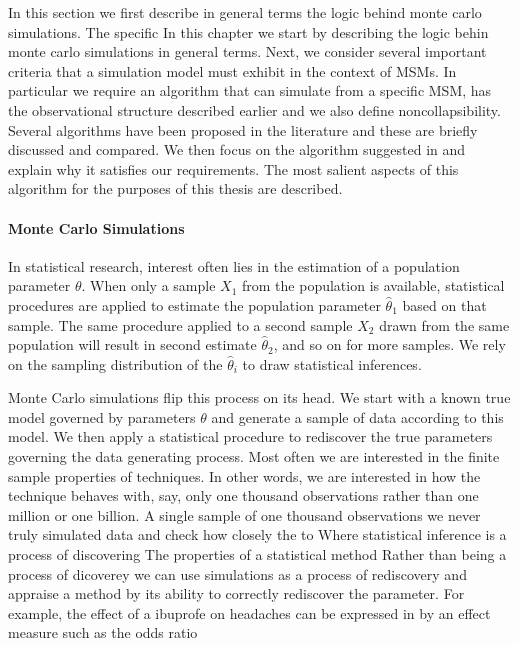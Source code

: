 \documentclass[11pt]{article}
\begin{document}
In this section we first describe in general terms the logic behind
monte carlo simulations. The specific In this chapter we start by
describing the logic behin monte carlo simulations in general terms.
Next, we consider several important criteria that a simulation model
must exhibit in the context of MSMs. In particular we require an
algorithm that can simulate from a specific MSM, has the observational
structure described earlier and we also define noncollapsibility.
Several algorithms have been proposed in the literature and these are
briefly discussed and compared. We then focus on the algorithm suggested
in \citet{} and explain why it satisfies our requirements. The most
salient aspects of this algorithm for the purposes of this thesis are
described.

    \paragraph{Monte Carlo Simulations}\label{monte-carlo-simulations}

In statistical research, interest often lies in the estimation of a
population parameter \(\theta\). When only a sample \(X_1\) from the
population is available, statistical procedures are applied to estimate
the population parameter \(\hat \theta_1\) based on that sample. The
same procedure applied to a second sample \(X_2\) drawn from the same
population will result in second estimate \(\hat \theta_2\), and so on
for more samples. We rely on the sampling distribution of the
\(\hat \theta_i\) to draw statistical inferences. \linebreak 

Monte Carlo simulations flip this process on its head. We start with a
known true model governed by parameters \(\theta\) and generate a sample
of data according to this model. We then apply a statistical procedure
to rediscover the true parameters governing the data generating process.
Most often we are interested in the finite sample properties of
techniques. In other words, we are interested in how the technique
behaves with, say, only one thousand observations rather than one
million or one billion. A single sample of one thousand observations we
never truly simulated data and check how closely the to Where
statistical inference is a process of discovering The properties of a
statistical method Rather than being a process of dicoverey we can use
simulations as a process of rediscovery and appraise a method by its
ability to correctly rediscover the parameter. For example, the effect
of a ibuprofe on headaches can be expressed in by an effect measure such
as the odds ratio \linebreak
\end{document}
